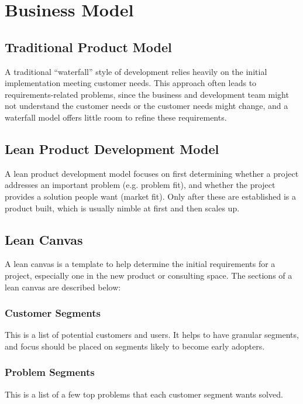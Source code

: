\documentclass[12pt,titlepage]{article}
\begin{document}
  \newpage

  \section{Business Model}
    \subsection{Traditional Product Model}
      A traditional ``waterfall'' style of development relies heavily on the initial implementation meeting customer needs. This
      approach often leads to requirements-related problems, since the business and development team might not understand the
      customer needs or the customer needs might change, and a waterfall model offers little room to refine these requirements.

    \subsection{Lean Product Development Model}
      A lean product development model focuses on first determining whether a project addresses an important problem (e.g. problem
      fit), and whether the project provides a solution people want (market fit). Only after these are established is a product built,
      which is usually nimble at first and then scales up.

    \subsection{Lean Canvas}
      A lean canvas is a template to help determine the initial requirements for a project, especially one in the new product or
      consulting space. The sections of a lean canvas are described below:

      \subsubsection{Customer Segments}
        This is a list of potential customers and users. It helps to have granular segments, and focus should be placed on segments likely
        to become early adopters.

      \subsubsection{Problem Segments}
        This is a list of a few top problems that each customer segment wants solved.
\end{document}

